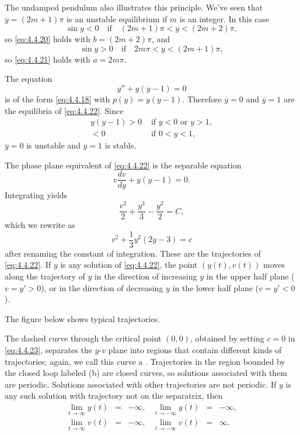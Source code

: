 \documentclass{ximera}
\begin{document}
The undamped pendulum also illustrates this principle. We've seen that
$\overline{y}=(2m+1)\pi$ is an unstable equilibrium if $m$ is an
integer. In this case
$$
\sin y<0\quad\mbox{if}\quad(2m+1)\pi<y<(2m+2)\pi,
$$
so \eqref{eq:4.4.20} holds with $b=(2m+2)\pi$, and
$$
\sin y>0\quad\mbox{if}\quad 2m\pi<y<(2m+1)\pi,
$$
so \eqref{eq:4.4.21} holds with $a=2m\pi$.
 
 
\begin{example} \label{example:4.4.3}
The equation
\begin{equation} \label{eq:4.4.22}
y''+y(y-1)=0
\end{equation}
is of the form \eqref{eq:4.4.18} with $p(y)=y(y-1)$. Therefore $\overline{y}=0$ and $\overline{y}=1$ are the equilibria of \eqref{eq:4.4.22}. Since
\begin{eqnarray*}
y(y-1)>0 &\mbox{ if } y<0\mbox{ or }y>1,\\
<0&\mbox{ if } 0<y<1,
\end{eqnarray*}
$\overline{y}=0$ is unstable and $\overline{y}=1$ is
stable.
 
The phase plane equivalent of \eqref{eq:4.4.22} is the separable equation
$$
v\frac{dv}{dy}+y(y-1)=0.
$$
Integrating yields
$$
\frac{v^2}{2}+\frac{y^3}{3}-\frac{y^2}{2}=C,
$$
which we rewrite  as
\begin{equation} \label{eq:4.4.23}
v^2+\frac{1}{3}y^2(2y-3)=c
\end{equation}
after renaming the constant of integration. These are the trajectories
of \eqref{eq:4.4.22}. If $y$ is any solution of \eqref{eq:4.4.22},  the
point $(y(t),v(t))$ moves along the trajectory of $y$ in the direction
of increasing $y$ in the upper half plane ($v=y'>0$), or in the
direction of decreasing $y$ in the lower half plane ($v=y'<0$).
 
The figure below shows
typical trajectories.

\begin{center}
\end{center}

 
 
The
dashed curve through the critical point $(0,0)$, obtained by setting
$c=0$ in \eqref{eq:4.4.23}, separates the $y$-$v$ plane into regions
that contain different kinds of trajectories; again,
 we call this curve a .
Trajectories in the region bounded by the closed loop labeled (b) are closed
curves,
so solutions associated with them are periodic. Solutions associated
with other trajectories are not periodic. If $y$ is any such solution
with trajectory not  on the separatrix, then
$$
\begin{array}{llrllr}
\lim_{t\rightarrow\infty}y(t)&=&-\infty, &\lim_{t\rightarrow-\infty}y(t)&=&-\infty,\\
\lim_{t\rightarrow\infty}v(t)&=&-\infty,
&\lim_{t\rightarrow-\infty}v(t)&=&\infty.
\end{array}
$$
 

\end{example}
\end{document}
